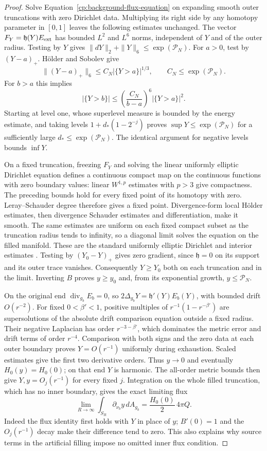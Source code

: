 \begin{proof}
Solve Equation~\eqref{cp:background-flux-equation} on expanding
smooth outer truncations with zero Dirichlet data.  Multiplying
its right side by any homotopy parameter in $[0,1]$ leaves the
following estimates unchanged.  The vector
$F_Y=\mathfrak h(Y)E_{\rm ext}$ has bounded $L^2$ and $L^6$ norms,
independent of $Y$ and of the outer radius.  Testing by $Y$ gives
$\|dY\|_2+\|Y\|_6\le\exp(\mathcal P_N)$.
For $a>0$, test by $(Y-a)_+$.  H\"older and Sobolev give
\[
 \|(Y-a)_+\|_6\le C_N|\{Y>a\}|^{1/3},
 \qquad C_N\le\exp(\mathcal P_N).
\]
For $b>a$ this implies
\[
 |\{Y>b\}|\le
 \left(\frac{C_N}{b-a}\right)^6|\{Y>a\}|^2.
\]
Starting at level one, whose superlevel measure is bounded by the
energy estimate, and taking levels $1+d_*(1-2^{-j})$ proves
$\sup Y\le\exp(\mathcal P_N)$ for a sufficiently large
$d_*\le\exp(\mathcal P_N)$.  The identical argument for negative
levels bounds $\inf Y$.

On a fixed truncation, freezing $F_Y$ and solving the linear
uniformly elliptic Dirichlet equation defines a continuous compact
map on the continuous functions with zero boundary values:
linear $W^{1,p}$ estimates with $p>3$ give compactness.
The preceding bounds hold for every fixed point of its homotopy
with zero.  Leray--Schauder degree therefore gives a fixed point.
Divergence-form local H\"older estimates, then divergence Schauder
estimates and differentiation, make it smooth.  The same estimates
are uniform on each fixed compact subset as the truncation radius
tends to infinity, so a diagonal limit solves the equation on the
filled manifold.  These are the standard uniformly elliptic
Dirichlet and interior estimates
\cite[Chapters~6--8]{GilbargTrudinger2001}.
Testing by $(Y_0-Y)_+$ gives zero gradient, since
$\mathfrak h=0$ on its support and its outer trace vanishes.
Consequently $Y\ge Y_0$ both on each truncation and in the limit.
Inverting $B$ proves $y\ge y_0$ and, from its exponential growth,
$y\le\mathcal P_N$.

On the original end $\operatorname{div}_{g_b}E_b=0$, so
$2\Delta_{g_b}Y=\mathfrak h'(Y)E_b(Y)$, with bounded drift
$O(r^{-2})$.  For fixed $0<\beta'<1$, positive multiples of
$r^{-1}(1-r^{-\beta'})$ are supersolutions of the absolute drift
comparison equation outside a fixed radius.  Their negative
Laplacian has order $r^{-3-\beta'}$, which dominates the metric
error and drift terms of order $r^{-4}$.  Comparison with both
signs and the zero data at each outer boundary proves
$Y=O(r^{-1})$ uniformly during exhaustion.  Scaled estimates give
the first two derivative orders.  Thus $y\to0$ and eventually
$H_0(y)=H_0(0)$; on that end $Y$ is harmonic.  The all-order metric
bounds then give $Y,y=O_j(r^{-1})$ for every fixed $j$.
Integration on the whole filled truncation, which has no inner
boundary, gives the exact limiting flux
\begin{equation}\label{cp:conversion-flux}
 \lim_{R\to\infty}\int_{S_R}\partial_{\nu_b}y\,dA_{g_b}
       =\frac{H_0(0)}2\,4\pi Q.
\end{equation}
Indeed the flux identity first holds with $Y$ in place of $y$;
$B'(0)=1$ and the $O_j(r^{-1})$ decay make their difference tend
to zero.  This also explains why source terms in the artificial
filling impose no omitted inner flux condition.


\end{proof}

